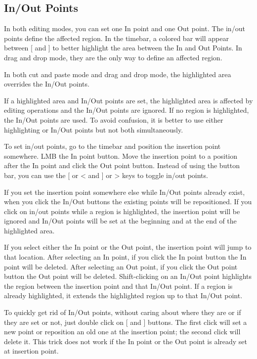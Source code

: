 \subsection{In/Out Points}%
\label{sub:in_out_points}

In both editing modes, you can set one In point and one Out point. 
The in/out points define the affected region. In the timebar, a colored bar will appear between [ and ] to better highlight the area between the In and Out Points.
In drag and drop mode, they are the only way to define an affected region.

In both cut and paste mode and drag and drop mode, the highlighted area overrides the In/Out points. 

If a highlighted area and In/Out points are set, the highlighted area is affected by editing operations and the In/Out points are ignored. 
If no region is highlighted, the In/Out points are used. 
To avoid confusion, it is better to use either highlighting or In/Out points but not both simultaneously.

To set in/out points, go to the timebar and position the insertion point somewhere. 
LMB the In point button. 
Move the insertion point to a position after the In point and click the Out point button. 
Instead of using the button bar, you can use the [ or < and ] or > keys to toggle in/out points.

If you set the insertion point somewhere else while In/Out points already exist, when you click the In/Out buttons the existing points will be repositioned. 
If you click on in/out points while a region is highlighted, the insertion point will be ignored and In/Out points will be set at the beginning and at the end of the highlighted area.

If you select either the In point or the Out point, the insertion point will jump to that location. 
After selecting an In point, if you click the In point button the In point will be deleted. 
After selecting an Out point, if you click the Out point button the Out point will be deleted. 
Shift-clicking on an In/Out point highlights the region between the insertion point and that In/Out point. 
If a region is already highlighted, it extends the highlighted region up to that In/Out point.

To quickly get rid of In/Out points, without caring about where they are or if they are set or not, just double click on [ and ] buttons. 
The first click will set a new point or reposition an old one at the insertion point; the second click will delete it. This trick does not work if the In point or the Out point is already set at insertion point.

